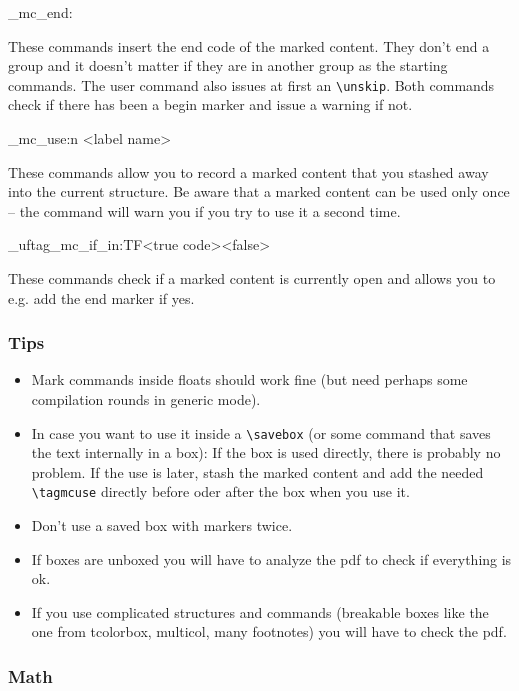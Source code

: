 \documentclass[DIV=12,parskip=half-,bibliography=totoc]{scrartcl}
\begin{document}
\ExplSyntaxOn
\DescribeMacro\tagmcend
\DescribeMacro\uftag_mc_end:
\ExplSyntaxOff

These commands insert the end code of the marked content. They don't end a group and it doesn't matter if they are in another group as the starting commands. The user command also issues at first an \verb+\unskip+. Both commands check if there has been a begin marker and issue a warning if not.

\ExplSyntaxOn
\DescribeMacro{}
\DescribeMacro\uftag_mc_use:n {<label name>}
\ExplSyntaxOff

These commands allow you to record a marked content that you stashed away into the current structure. Be aware that a marked content can be used only once -- the command will warn you if you try to use it a second time.

\ExplSyntaxOn
\DescribeMacro{}
\DescribeMacro\_uftag_mc_if_in:TF{<true code>}{<false>}
\ExplSyntaxOff

These commands check if a marked content is currently open and allows you to e.g. add the end marker if yes.

\subsubsection{Tips}

\begin{itemize}
\item Mark commands inside floats should work fine (but need perhaps some compilation rounds in generic mode).
\item In case you want to use it inside a \verb+\savebox+ (or some command that saves the text internally in a box): If the box is used directly, there is probably no problem. If the use is later, stash the marked content and add the needed \verb+\tagmcuse+ directly  before oder after the box when you use it.
\item Don't use a saved box with markers twice.
\item If boxes are unboxed you will have to analyze the pdf to check if everything is ok.
\item If you use complicated structures and commands (breakable boxes like the one from tcolorbox, multicol, many footnotes) you will have to check the pdf.
 \end{itemize}

\subsubsection{Math}
\end{document}
